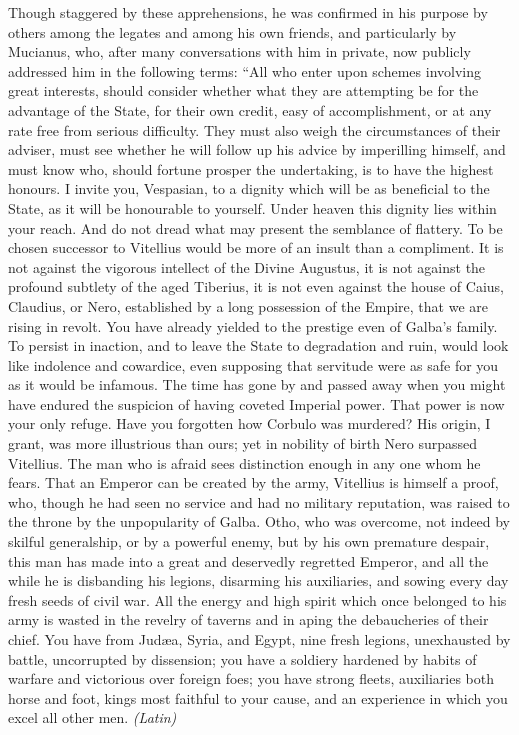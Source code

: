 Though staggered by these apprehensions, he was confirmed in his purpose by others among the legates and among his own friends, and particularly by Mucianus, who, after many conversations with him in private, now publicly addressed him in the following terms: ``All who enter upon schemes involving great interests, should consider whether what they are attempting be for the advantage of the State, for their own credit, easy of accomplishment, or at any rate free from serious difficulty. They must also weigh the circumstances of their adviser, must see whether he will follow up his advice by imperilling himself, and must know who, should fortune prosper the undertaking, is to have the highest honours. I invite you, Vespasian, to a dignity which will be as beneficial to the State, as it will be honourable to yourself. Under heaven this dignity lies within your reach. And do not dread what may present the semblance of flattery. To be chosen successor to Vitellius would be more of an insult than a compliment. It is not against the vigorous intellect of the Divine Augustus, it is not against the profound subtlety of the aged Tiberius, it is not even against the house of Caius, Claudius, or Nero, established by a long possession of the Empire, that we are rising in revolt. You have already yielded to the prestige even of Galba's family. To persist in inaction, and to leave the State to degradation and ruin, would look like indolence and cowardice, even supposing that servitude were as safe for you as it would be infamous. The time has gone by and passed away when you might have endured the suspicion of having coveted Imperial power. That power is now your only refuge. Have you forgotten how Corbulo was murdered? His origin, I grant, was more illustrious than ours; yet in nobility of birth Nero surpassed Vitellius. The man who is afraid sees distinction enough in any one whom he fears. That an Emperor can be created by the army, Vitellius is himself a proof, who, though he had seen no service and had no military reputation, was raised to the throne by the unpopularity of Galba. Otho, who was overcome, not indeed by skilful generalship, or by a powerful enemy, but by his own premature despair, this man has made into a great and deservedly regretted Emperor, and all the while he is disbanding his legions, disarming his auxiliaries, and sowing every day fresh seeds of civil war. All the energy and high spirit which once belonged to his army is wasted in the revelry of taverns and in aping the debaucheries of their chief. You have from Judæa, Syria, and Egypt, nine fresh legions, unexhausted by battle, uncorrupted by dissension; you have a soldiery hardened by habits of warfare and victorious over foreign foes; you have strong fleets, auxiliaries both horse and foot, kings most faithful to your cause, and an experience in which you excel all other men. \emph{(Latin)}


